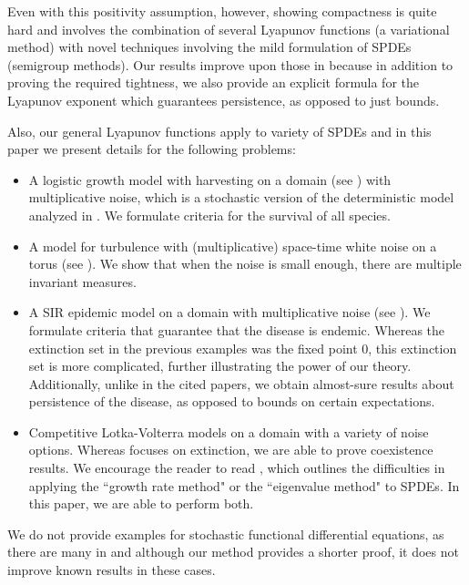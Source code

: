 \documentclass[final]{amsart}
\numberwithin{thm}{section}
\numberwithin{equation}{section}
\begin{document}
 
 
 Even with this positivity assumption, however, showing compactness is quite hard and involves the combination of several Lyapunov functions (a variational method) with novel techniques involving the mild formulation of SPDEs (semigroup methods). Our results improve upon those in \cite{space-time, stochastic-SIR-analytical} because in addition to proving the required tightness, we also provide an explicit formula for the Lyapunov exponent which guarantees persistence, as opposed to just bounds. 
 
 Also, our general Lyapunov functions apply to variety of SPDEs and in this paper we present details for the following problems:
\begin{itemize}
    \item A logistic growth model with harvesting on a domain (see ) with multiplicative noise, which is a stochastic version of the deterministic model analyzed in \cite{carrying-capacity}. We formulate criteria for the survival of all species.
    \item A model for turbulence with (multiplicative) space-time white noise on a torus \cite{space-time, physics-interpretation} (see ). We show that when the noise is small enough, there are multiple invariant measures.
    \item A SIR epidemic model on a domain with multiplicative noise \cite{stochastic-SIR, stochastic-SIR-analytical, stochastic-SIR-NN, nhu-positivity} (see ). We formulate criteria that guarantee that the disease is endemic. Whereas the extinction set in the previous examples was the fixed point $0$, this extinction set is more complicated, further illustrating the power of our theory. Additionally, unlike in the cited papers, we obtain almost-sure results about persistence of the disease, as opposed to bounds on certain expectations.
    \item Competitive Lotka-Volterra models on a domain with a variety of noise options. Whereas \cite{stochastic-lotka-volterra-SPDE} focuses on extinction, we are able to prove coexistence results. We encourage the reader to read \cite[7.3. Discussion]{stochastic-lotka-volterra-SPDE}, which outlines the difficulties in applying the ``growth rate method" or the ``eigenvalue method" to SPDEs. In this paper, we are able to perform both.
\end{itemize}

 We do not provide examples for stochastic functional differential equations, as there are many in \cite[Section 5]{functional} and although our method provides a shorter proof, it does not improve known results in these cases.
 
\end{document}
